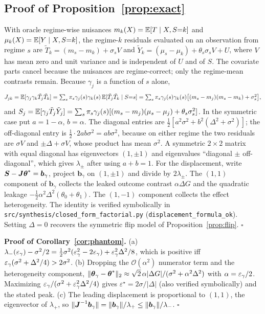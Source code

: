 \subsection{Proof of Proposition~\ref{prop:exact}}
With oracle regime-wise nuisances $m_k(X)=\mathbb{E}[T\mid X,S{=}k]$ and $\mu_k(X)=\mathbb{E}[Y\mid X,S{=}k]$, the regime-$k$ residuals evaluated on an observation from regime $s$ are $\tilde T_k=(m_s-m_k)+\sigma_sV$ and $\tilde Y_k=(\mu_s-\mu_k)+\theta_s\sigma_sV+U$, where $V$ has mean zero and unit variance and is independent of $U$ and of $S$. The covariate parts cancel because the nuisances are regime-correct; only the regime-mean contrasts remain. Because $\gamma_j$ is a function of $s$ alone,
\[
J_{jk}=\mathbb{E}[\gamma_j\gamma_k\tilde T_j\tilde T_k]=\textstyle\sum_s\pi_s\gamma_j(s)\gamma_k(s)\,\mathbb{E}[\tilde T_j\tilde T_k\mid S{=}s]
=\textstyle\sum_s\pi_s\gamma_j(s)\gamma_k(s)\big[(m_s-m_j)(m_s-m_k)+\sigma_s^2\big],
\]
and $S_j=\mathbb{E}[\gamma_j\tilde T_j\tilde Y_j]=\sum_s\pi_s\gamma_j(s)[(m_s-m_j)(\mu_s-\mu_j)+\theta_s\sigma_s^2]$.
In the symmetric case put $a=1-\alpha$, $b=\alpha$. The diagonal entries are $\tfrac12[a^2\sigma^2+b^2(\Delta^2+\sigma^2)]$; the off-diagonal entry is $\tfrac12\cdot2ab\sigma^2=ab\sigma^2$, because on either regime the two residuals are $\sigma V$ and $\pm\Delta+\sigma V$, whose product has mean $\sigma^2$. A symmetric $2\times2$ matrix with equal diagonal has eigenvectors $(1,\pm1)$ and eigenvalues ``diagonal $\pm$ off-diagonal'', which gives $\lambda_\pm$ after using $a+b=1$. For the displacement, write $\boldsymbol{S}-\boldsymbol{J}\boldsymbol{\theta}^*=\boldsymbol b_\gamma$, project $\boldsymbol b_\gamma$ on $(1,\pm1)$ and divide by $2\lambda_\pm$. The $(1,1)$ component of $\boldsymbol b_\gamma$ collects the leaked outcome contrast $\alpha\Delta G$ and the quadratic leakage $-\tfrac12\alpha^2\Delta^2(\theta_0+\theta_1)$. The $(1,-1)$ component collects the effect heterogeneity. The identity is verified symbolically in \texttt{src/synthesis/closed\_form\_factorial.py} (\texttt{displacement\_formula\_ok}). Setting $\Delta=0$ recovers the symmetric flip model of Proposition~\ref{prop:flip}. $\square$

\textbf{Proof of Corollary~\ref{cor:phantom}.} (a) $\lambda_-(\varepsilon_\gamma)-\sigma^2/2=\tfrac12\sigma^2(\varepsilon_\gamma^2-2\varepsilon_\gamma)+\varepsilon_\gamma^2\Delta^2/8$, which is positive iff $\varepsilon_\gamma(\sigma^2+\Delta^2/4)>2\sigma^2$. (b) Dropping the $\mathcal O(\alpha^2)$ numerator term and the heterogeneity component, $\|\boldsymbol{\theta}_\gamma-\boldsymbol{\theta}^*\|_2\approx\sqrt2\,\alpha|\Delta G|/(\sigma^2+\alpha^2\Delta^2)$ with $\alpha=\varepsilon_\gamma/2$. Maximizing $\varepsilon_\gamma/(\sigma^2+\varepsilon_\gamma^2\Delta^2/4)$ gives $\varepsilon^\star=2\sigma/|\Delta|$ (also verified symbolically) and the stated peak. (c) The leading displacement is proportional to $(1,1)$, the eigenvector of $\lambda_+$, so $\|\boldsymbol{J}^{-1}\boldsymbol b_\gamma\|=\|\boldsymbol b_\gamma\|/\lambda_+\le\|\boldsymbol b_\gamma\|/\lambda_-$. $\square$

